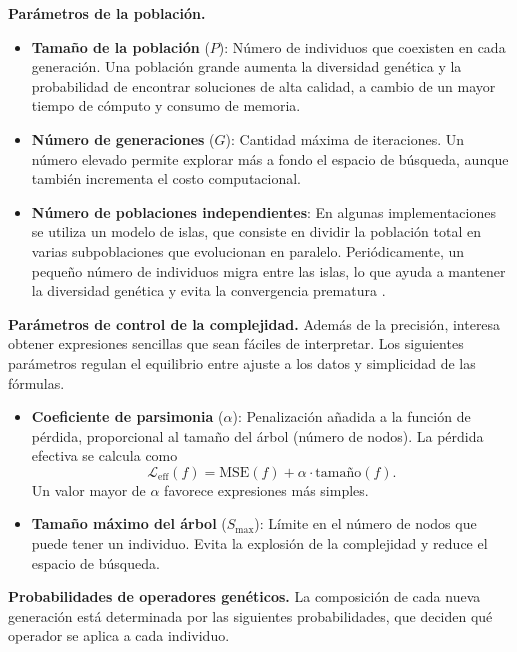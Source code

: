 \medskip \noindent\textbf{Parámetros de la población.} \begin{itemize} \item \textbf{Tamaño de la población} (\(P\)): Número de individuos que coexisten en cada generación. Una población grande aumenta la diversidad genética y la probabilidad de encontrar soluciones de alta calidad, a cambio de un mayor tiempo de cómputo y consumo de memoria.

	\item \textbf{Número de generaciones} (\(G\)): Cantidad máxima de iteraciones. Un número elevado permite explorar más a fondo el espacio de búsqueda, aunque también incrementa el costo computacional.

	\item \textbf{Número de poblaciones independientes}: En algunas implementaciones se utiliza un modelo de islas, que consiste en dividir la población total en varias subpoblaciones que evolucionan en paralelo. Periódicamente, un pequeño número de individuos migra entre las islas, lo que ayuda a mantener la diversidad genética y evita la convergencia prematura \cite{whitley1990island}. \end{itemize}

\medskip \noindent\textbf{Parámetros de control de la complejidad.} Además de la precisión, interesa obtener expresiones sencillas que sean fáciles de interpretar. Los siguientes parámetros regulan el equilibrio entre ajuste a los datos y simplicidad de las fórmulas.

\begin{itemize} \item \textbf{Coeficiente de parsimonia} (\(\alpha\)): Penalización añadida a la función de pérdida, proporcional al tamaño del árbol (número de nodos). La pérdida efectiva se calcula como \[ \mathcal{L}_{\text{eff}}(f) = \text{MSE}(f) + \alpha \cdot \text{tamaño}(f). \] Un valor mayor de \(\alpha\) favorece expresiones más simples.

	\item \textbf{Tamaño máximo del árbol} (\(S_{\max}\)): Límite en el número de nodos que puede tener un individuo. Evita la explosión de la complejidad y reduce el espacio de búsqueda. \end{itemize}

\medskip \noindent\textbf{Probabilidades de operadores genéticos.} La composición de cada nueva generación está determinada por las siguientes probabilidades, que deciden qué operador se aplica a cada individuo.

